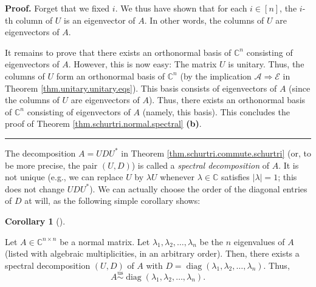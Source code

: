 \documentclass[numbers=enddot,12pt,final,onecolumn,notitlepage]{scrartcl}%
\numberwithin{exer}{subsection}
\theoremstyle{definition}
\newtheorem{coro}[theo]{Corollary}
\newenvironment{corollary}[1][]
{\begin{coro}[#1]\begin{leftbar}}
{\end{leftbar}\end{coro}}
\newenvironment{proof}[1][Proof]{\noindent\textbf{#1.} }{\ \rule{0.5em}{0.5em}}
\begin{document}
\begin{proof}
Forget that we fixed $i$. We thus have shown that for each $i\in\left[
n\right]  $, the $i$-th column of $U$ is an eigenvector of $A$. In other
words, the columns of $U$ are eigenvectors of $A$.

It remains to prove that there exists an orthonormal basis of $\mathbb{C}^{n}$
consisting of eigenvectors of $A$. However, this is now easy: The matrix $U$
is unitary. Thus, the columns of $U$ form an orthonormal basis of
$\mathbb{C}^{n}$ (by the implication $\mathcal{A}\Longrightarrow\mathcal{E}$
in Theorem \ref{thm.unitary.unitary.eqs}). This basis consists of eigenvectors
of $A$ (since the columns of $U$ are eigenvectors of $A$). Thus, there exists
an orthonormal basis of $\mathbb{C}^{n}$ consisting of eigenvectors of $A$
(namely, this basis). This concludes the proof of Theorem
\ref{thm.schurtri.normal.spectral} \textbf{(b)}.
\end{proof}

The decomposition $A=UDU^{\ast}$ in Theorem
\ref{thm.schurtri.commute.schurtri} (or, to be more precise, the pair $\left(
U,D\right)  $) is called a \emph{spectral decomposition} of $A$. It is not
unique (e.g., we can replace $U$ by $\lambda U$ whenever $\lambda\in
\mathbb{C}$ satisfies $\left\vert \lambda\right\vert =1$; this does not change
$UDU^{\ast}$). We can actually choose the order of the diagonal entries of $D$
at will, as the following simple corollary shows:

\begin{corollary}
\label{cor.schurtri.normal.given-order}Let $A\in\mathbb{C}^{n\times n}$ be a
normal matrix. Let $\lambda_{1},\lambda_{2},\ldots,\lambda_{n}$ be the $n$
eigenvalues of $A$ (listed with algebraic multiplicities, in an arbitrary
order). Then, there exists a spectral decomposition $\left(  U,D\right)  $ of
$A$ with $D=\operatorname*{diag}\left(  \lambda_{1},\lambda_{2},\ldots
,\lambda_{n}\right)  $. Thus,%
\begin{equation}
A\overset{\operatorname*{us}}{\sim}\operatorname*{diag}\left(  \lambda
_{1},\lambda_{2},\ldots,\lambda_{n}\right)  .
\label{eq.cor.schurtri.normal.given-order.us}%
\end{equation}

\end{corollary}
\end{document}
